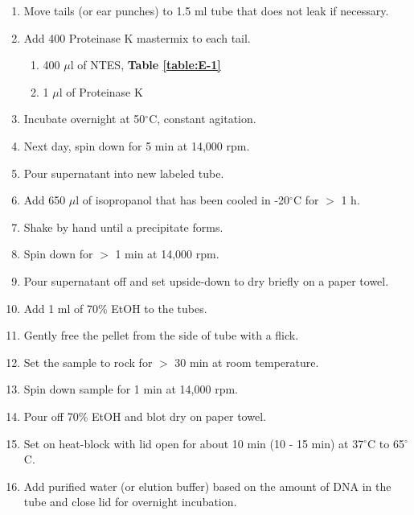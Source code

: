 \begin{enumerate}
\item Move tails (or ear punches) to 1.5 ml tube that does not leak if necessary.
\item Add 400 Proteinase K mastermix to each tail.
  \begin{enumerate}
  \item 400 $\mu$l of NTES, \textbf{Table \ref{table:E-1}}
  \item 1 $\mu$l of Proteinase K
  \end{enumerate}
\item Incubate overnight at 50$^{\circ}$C, constant agitation.
\item Next day, spin down for 5 min at 14,000 rpm.
\item Pour supernatant into new labeled tube.
\item Add 650 $\mu$l of isopropanol that has been cooled in -20$^{\circ}$C for $>$ 1 h\footnotemark. 
\item Shake by hand until a precipitate forms.
\item Spin down for $>$ 1 min at 14,000 rpm.
\item Pour supernatant off and set upside-down to dry briefly on a paper towel\footnotemark.  
\item Add 1 ml of 70\% EtOH to the tubes.
\item Gently free the pellet from the side of tube with a flick.
\item Set the sample to rock for $>$ 30 min at room temperature\footnotemark. 
\item Spin down sample for 1 min at 14,000 rpm.
\item Pour off 70\% EtOH and blot dry on paper towel.
\item Set on heat-block with lid open for about 10 min (10 - 15 min) at 37$^{\circ}$C to 65$^{\circ}$C.
\item Add purified water (or elution buffer) based on the amount of DNA in the tube and close lid for overnight incubation\footnotemark.  
\end{enumerate}

